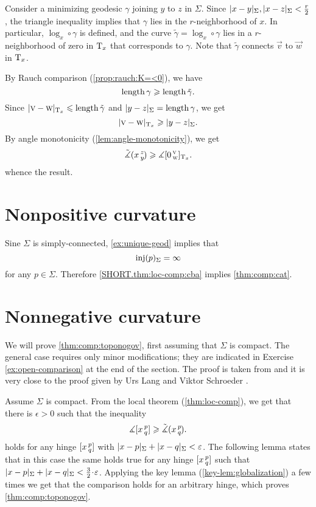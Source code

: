 Consider a minimizing geodesic $\gamma$ joining $y$ to $z$ in $\Sigma$.
Since $\dist{x}{y}{\Sigma},\dist{x}{z}{\Sigma}\z<\tfrac r2$, the triangle inequality implies that $\gamma$ lies in the $r$-neighborhood of $x$.
In particular, $\log_x\circ\gamma$ is defined, and the curve
$\tilde \gamma=\log_x\circ\gamma$ lies in a $r$-neighborhood of zero in $\mathrm{T}_x$ that corresponds to $\gamma$.
Note that $\tilde\gamma$ connects $\vec v$ to $\vec w$ in $\mathrm{T}_x$.

By Rauch comparison (\ref{prop:rauch:K=<0}), we have
\[\mathop{\rm length}\nolimits\gamma\geqslant \mathop{\rm length}\nolimits \tilde \gamma.\]
Since $\dist{\vec v}{\vec w}{\T_x}\le\length\tilde \gamma$ and $\dist{y}{z}{\Sigma}= \length\gamma$, we get 
\[\dist{\vec v}{\vec w}{\T_x}\ge \dist{y}{z}\Sigma.\]
By angle monotonicity (\ref{lem:angle-monotonicity}), we get
\[\tilde\measuredangle(x\,{}^{z}_{y}\hspace{-0.2ex})\geqslant\measuredangle[0\,{}^{\text{\sc{v}}}_{\text{\sc{w}}}]_{\mathrm{T}_x}.\]
whence the result.
\qeds

\section{Nonpositive curvature}\label{sec:nonpos-comp}

Sine $\Sigma$ is simply-connected, \ref{ex:unique-geod} implies that 
\[\mathop{\rm inj}\nolimits(p)_\Sigma=\infty\]
for any $p\in\Sigma$.
Therefore \ref{SHORT.thm:loc-comp:cba} implies \ref{thm:comp:cat}.
\qeds

\section{Nonnegative curvature}\label{sec:nonneg-comp}

We will prove \ref{thm:comp:toponogov}, first assuming that $\Sigma$ is compact.
The general case requires only minor modifications; they are indicated in Exercise \ref{ex:open-comparison} at the end of the section.
The proof is taken from \cite{alexander-kapovitch-petrunin2027} and it is very close to the proof given by Urs Lang and Viktor Schroeder \cite{lang-schroeder}.

\label{proof(thm:comp:toponogov)}
Assume $\Sigma$ is compact. 
From the local theorem (\ref{thm:loc-comp}), we get that there is $\epsilon>0$ such that the inequality 
\[\measuredangle[x\,{}^{p}_{q}]\geqslant\tilde\measuredangle(x\,{}^{p}_{q}\hspace{-0.2ex}).\]
holds for any hinge $[x\,{}^{p}_{q}]$ with  
$\dist{x}{p}\Sigma+\dist{x}{q}\Sigma<\epsilon$.
The following lemma states that in this case the same holds true for any hinge $[x\,{}^{p}_{q}]$ such that $\dist{x}{p}\Sigma+\dist{x}{q}\Sigma<\tfrac32\cdot\epsilon$.
Applying the key lemma (\ref{key-lem:globalization}) a few times we  get that the comparison holds for an arbitrary hinge, which proves \mbox{\ref{thm:comp:toponogov}}.
\qeds

